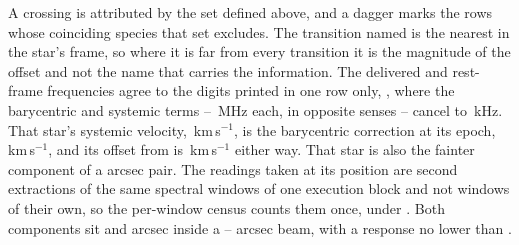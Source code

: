 A crossing is attributed by the set defined above, and a dagger marks the
\MkNSODecide{} rows whose coinciding species that set excludes. The
transition named is the nearest in the star's frame, so where it is far from
every transition it is the magnitude of the offset and not the name that
carries the information. The delivered and rest-frame frequencies agree to
the digits printed in one row only, \MkCancStar, where the barycentric and
systemic terms -- \MkCancBaryMHz\,MHz each, in opposite senses -- cancel to
\MkCancNetkHz\,kHz. That star's systemic velocity,
\MkCancVSys\,km\,s$^{-1}$, is the barycentric correction at its epoch,
\MkCancVBary\,km\,s$^{-1}$, and its offset from \MkCancLine{} is
\MkCancDv\,km\,s$^{-1}$ either way. That star is also the fainter component
of a \CenPairSep{} arcsec pair. The
\CenPairNWin{} readings taken at its position are second extractions of the
same \CenPairNWin{} spectral windows of one execution block and not windows
of their own, so the per-window census counts them once, under
\CenPairNameA. Both components sit \CenPairOffA{} and \CenPairOffB{} arcsec
inside a \CenPairPbFwhmLo--\CenPairPbFwhmHi{} arcsec beam, with a response no
lower than \CenPairPbRespLo.

\begin{table}
\centering
\caption{\textbf{The crossing ledger, from which every disposition in this
paper can be reproduced.} All \EvNCrossRaw{} threshold crossings, one to a
window, including the \EvNCrossFlag{} in the failing block of
\S\ref{sec:bdblock}. The columns, the blanks and the dagger are defined
in \S\ref{sec:ledgercolumns}. Block identifiers omit the constant
\texttt{A002\_} prefix.}
\label{tab:ledger}
\scriptsize

\end{table}

